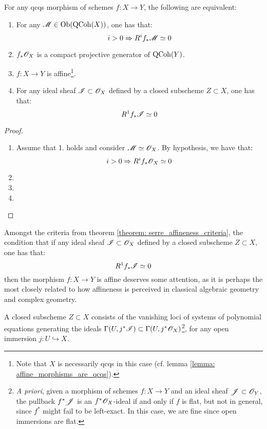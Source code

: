             \begin{theorem} \label{theorem: serre_affineness_criteria}
                For any qcqs morphism of schemes $f: X \to Y$, the following are equivalent:
                \begin{enumerate}
                    \item For any $\mathscr{M} \in \mathrm{Ob}(\mathrm{QCoh}(X))$, one has that:
                        $$i > 0 \Rightarrow R^i f_*\mathscr{M} \simeq 0$$
                    \item $f_*\mathscr{O}_X$ is a compact projective generator of $\mathrm{QCoh}(Y)$. 
                    \item $f: X \to Y$ is affine\footnote{Note that $X$ is necessarily qcqs in this case (cf. lemma \ref{lemma: affine_morphisms_are_qcqs}).}.
                    \item For any ideal sheaf $\mathscr{I} \subset \mathscr{O}_X$ defined by a closed subscheme $Z \subset X$, one has that:
                        $$R^1 f_*\mathscr{I} \simeq 0$$
                \end{enumerate}
            \end{theorem}
                \begin{proof}
                    \begin{enumerate}
                        \item Assume that 1. holds and consider $\mathscr{M} \simeq \mathscr{O}_X$. By hypothesis, we have that:
                            $$i > 0 \Rightarrow R^i f_*\mathscr{O}_X \simeq 0$$
                        \item 
                        \item 
                        \item 
                    \end{enumerate}
                \end{proof}
            \begin{remark}
                Amongst the criteria from theorem \ref{theorem: serre_affineness_criteria}, the condition that if any ideal sheaf $\mathscr{I} \subset \mathscr{O}_X$ defined by a closed subscheme $Z \subset X$, one has that:
                    $$R^1 f_*\mathscr{I} \simeq 0$$
                then the morphism $f: X \to Y$ is affine deserves some attention, as it is perhaps the most closely related to how affineness is perceived in classical algebraic geometry and complex geometry. 

                A closed subscheme $Z \subset X$ consists of the vanishing loci of systems of polynomial equations generating the ideals $\Gamma(U, j^*\mathscr{I}) \subset \Gamma(U, j^*\mathscr{O}_X)$\footnote{\textit{A priori}, given a morphism of schemes $f: X \to Y$ and an ideal sheaf $\mathscr{J} \subset \mathscr{O}_Y$, the pullback $f^*\mathscr{J}$ is an $f^*\mathscr{O}_X$-ideal if and only if $f$ is flat, but not in general, since $f^*$ might fail to be left-exact. In this case, we are fine since open immersions are flat.}, for any open immersion $j: U \hookrightarrow X$. 
            \end{remark}

